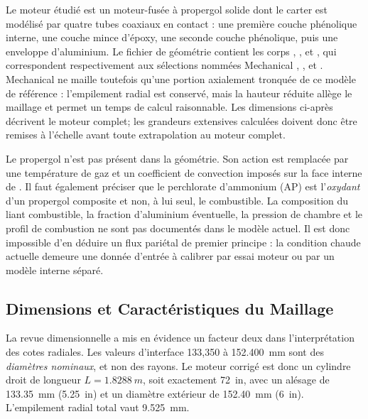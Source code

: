 \documentclass[oneside,openany]{amsdtx}
\begin{document}
Le moteur étudié est un moteur-fusée à propergol solide dont le carter est
modélisé par quatre tubes coaxiaux en contact : une première couche phénolique
interne, une couche mince d'époxy, une seconde couche phénolique, puis une
enveloppe d'aluminium. Le fichier de géométrie contient les corps
, ,  et , qui correspondent
respectivement aux sélections nommées Mechanical , ,
 et . Mechanical ne maille toutefois qu'une portion
axialement tronquée de ce modèle de référence : l'empilement radial est conservé,
mais la hauteur réduite allège le maillage et permet un temps de calcul
raisonnable. Les dimensions ci-après décrivent le moteur complet; les grandeurs
extensives calculées doivent donc être remises à l'échelle avant toute
extrapolation au moteur complet.

Le propergol n'est pas présent dans la géométrie. Son action est remplacée par
une température de gaz et un coefficient de convection imposés sur la face
interne de . Il faut également préciser que le perchlorate d'ammonium
(AP) est l'\emph{oxydant} d'un propergol composite et non, à lui seul, le
combustible. La composition du liant combustible, la fraction d'aluminium
éventuelle, la pression de chambre et le profil de combustion ne sont pas
documentés dans le modèle actuel. Il est donc impossible d'en déduire un flux
pariétal de premier principe : la condition chaude actuelle demeure une donnée
d'entrée à calibrer par essai moteur ou par un modèle interne séparé.

\subsection{Dimensions et Caractéristiques du Maillage}

La revue dimensionnelle a mis en évidence un facteur deux dans l'interprétation
des cotes radiales. Les valeurs d'interface 133,350 à \SI{152.400}{mm} sont des
\emph{diamètres nominaux}, et non des rayons. Le moteur corrigé est donc un
cylindre droit de longueur \(L=\SI{1.8288}{m}\), soit exactement \SI{72}{in},
avec un alésage de \SI{133.35}{mm} (\SI{5.25}{in}) et un diamètre extérieur de
\SI{152.40}{mm} (\SI{6}{in}). L'empilement radial total vaut
\SI{9.525}{mm}.

\begin{center}
\end{center}
\end{document}
